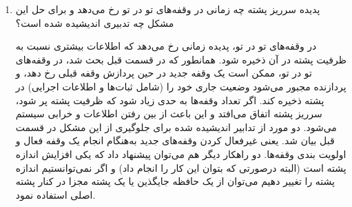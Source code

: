 \begin{enumerate}
\begin{qsolve}
\begin{enumerate}
		\end{enumerate}
	\end{qsolve}
	
	
	\item 
	پدیده سرریز پشته چه زمانی در وقفه‌های تو در تو رخ می‌دهد و برای حل این مشکل چه تدبیری اندیشیده شده است؟
	\begin{qsolve}
		در وقفه‌های تو در تو، پدیده  زمانی رخ می‌دهد که اطلاعات بیشتری نسبت به ظرفیت پشته در آن ذخیره شود. همانطور که در قسمت قبل بحث شد، در وقفه‌های تو در تو، ممکن است یک وقفه جدید در حین پردازش وقفه قبلی رخ دهد، و پردازنده مجبور می‌شود وضعیت جاری خود را (شامل ثبات‌ها و اطلاعات اجرایی) در پشته ذخیره کند. اگر تعداد وقفه‌ها به حدی زیاد شود که ظرفیت پشته پر شود، سرریز پشته اتفاق می‌افتد و این باعث از بین رفتن اطلاعات و خرابی سیستم می‌شود. دو مورد از تدابیر اندیشیده شده برای جلوگیری از این مشکل در قسمت قبل بیان شد. یعنی غیر‌فعال کردن وقفه‌های جدید به‌هنگام انجام  یک وقفه فعال و اولویت بندی وقفه‌ها. دو راهکار دیگر هم می‌توان پیشنهاد داد که یکی افزایش اندازه پشته است (البته درصورتی که بتوان این کار را انجام داد) و اگر نمی‌توانستیم اندازه پشته را تغییر دهیم می‌توان از یک حافظه جایگذین یا یک پشته مجزا در کنار پشته اصلی استفاده نمود.
	\end{qsolve}
	
\end{enumerate}
